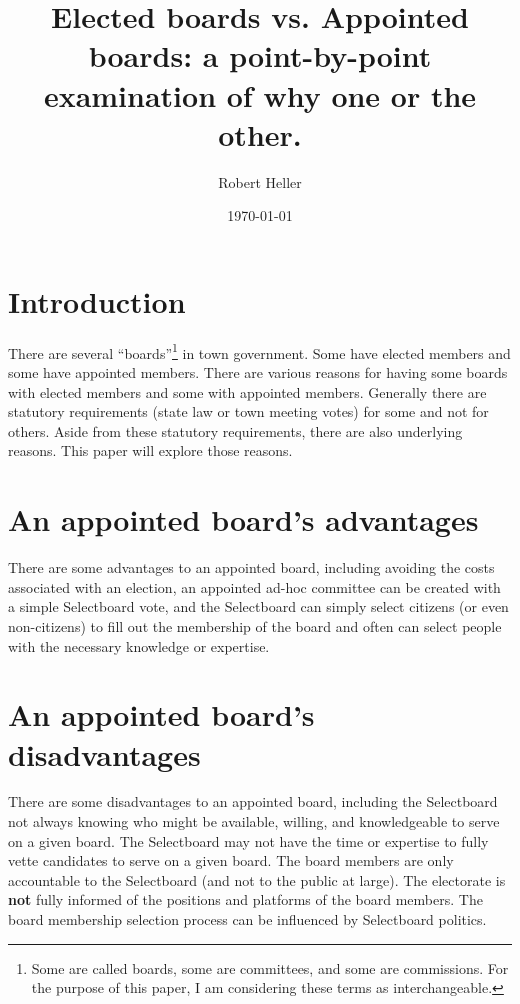 \documentclass[12pt]{article}
\title{Elected boards vs. Appointed boards: a point-by-point examination of why one or the other.}
\author{Robert Heller}
\date{\today}
\begin{document}
\maketitle

\tableofcontents

\section{Introduction}

There are several ``boards''\footnote{Some are called boards, some are
committees, and some are commissions. For the purpose of this paper, I am
considering these terms as interchangeable.} in town government. Some have
elected members and some have appointed members\cite{Classroom2017}. There are
various reasons for having some boards with elected members and some with
appointed members. Generally there are statutory requirements (state law or
town meeting votes) for some and not for others. Aside from these statutory
requirements, there are also underlying reasons. This paper will explore those
reasons.

\section{An appointed board's advantages}

There are some advantages to an appointed board, including avoiding the costs 
associated with an election, an appointed ad-hoc committee can be created with 
a simple Selectboard vote, and the Selectboard can simply select citizens (or 
even non-citizens) to fill out the membership of the board and often can 
select people with the necessary knowledge or expertise.

\section{An appointed board's disadvantages}

There are some disadvantages to an appointed board, including the Selectboard
not always knowing who might be available, willing, and knowledgeable to serve
on a given board. The Selectboard may not have the time or expertise to fully
vette candidates to serve on a given board. The board members are only
accountable to the Selectboard (and not to the public at large). The
electorate is \textbf{not} fully informed of the positions and platforms of
the board members. The board membership selection process can be influenced by
Selectboard politics.
\end{document}
